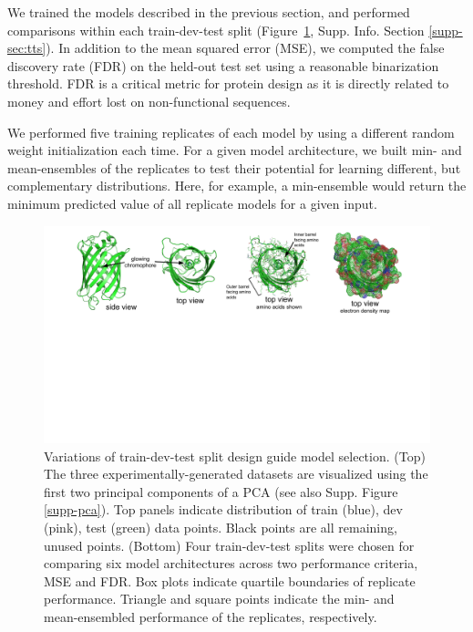We trained the models described in the previous section, and performed comparisons within each train-dev-test split (Figure~\ref{fig-tts}, Supp. Info. Section \ref{supp-sec:tts}). In addition to the mean squared error (MSE), we computed the false discovery rate (FDR) on the held-out test set using a reasonable binarization threshold. FDR is a critical metric for protein design as it is directly related to money and effort lost on non-functional sequences.

We performed five training replicates of each model by using a different random weight initialization each time. For a given model architecture, we built min- and mean-ensembles of the replicates to test their potential for learning different, but complementary distributions. Here, for example, a min-ensemble would return the minimum predicted value of all replicate models for a given input. 

\begin{figure}
  \includegraphics[width=1\linewidth,page=3,trim={1cm 0.5cm 1cm 0}]{figures/2018-05-09-NIPS_2018_Figures.pdf}
  \caption{\small{
    Variations of train-dev-test split design guide model selection. (Top) The three experimentally-generated datasets are visualized using the first two principal components of a PCA (see also Supp. Figure \ref{supp-pca}). Top panels indicate distribution of train (blue), dev (pink), test (green) data points. Black points are all remaining, unused points. (Bottom) Four train-dev-test splits were chosen for comparing six model architectures across two performance criteria, MSE and FDR.  Box plots indicate quartile boundaries of replicate performance. Triangle and square points indicate the min- and mean-ensembled performance of the replicates, respectively.}
    }
    \label{fig-tts}
    \vspace{-0.6cm}
\end{figure}

